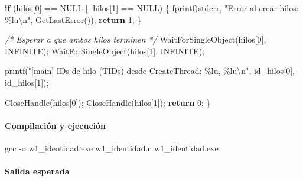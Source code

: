 \documentclass[
  spanish,
]{article}
\newenvironment{Shaded}{}{}
\newcommand{\AttributeTok}[1]{\textcolor[rgb]{0.49,0.56,0.16}{#1}}
\newcommand{\CommentTok}[1]{\textcolor[rgb]{0.38,0.63,0.69}{\textit{#1}}}
\newcommand{\ControlFlowTok}[1]{\textcolor[rgb]{0.00,0.44,0.13}{\textbf{#1}}}
\newcommand{\DecValTok}[1]{\textcolor[rgb]{0.25,0.63,0.44}{#1}}
\newcommand{\NormalTok}[1]{#1}
\newcommand{\OperatorTok}[1]{\textcolor[rgb]{0.40,0.40,0.40}{#1}}
\newcommand{\SpecialCharTok}[1]{\textcolor[rgb]{0.25,0.44,0.63}{#1}}
\newcommand{\StringTok}[1]{\textcolor[rgb]{0.25,0.44,0.63}{#1}}
\begin{document}
\begin{Shaded}
\begin{Highlighting}[]
    \ControlFlowTok{if} \OperatorTok{(}\NormalTok{hilos}\OperatorTok{[}\DecValTok{0}\OperatorTok{]} \OperatorTok{==}\NormalTok{ NULL }\OperatorTok{||}\NormalTok{ hilos}\OperatorTok{[}\DecValTok{1}\OperatorTok{]} \OperatorTok{==}\NormalTok{ NULL}\OperatorTok{)} \OperatorTok{\{}
\NormalTok{        fprintf}\OperatorTok{(}\NormalTok{stderr}\OperatorTok{,} \StringTok{"Error al crear hilos: }\SpecialCharTok{\%lu\textbackslash{}n}\StringTok{"}\OperatorTok{,}\NormalTok{ GetLastError}\OperatorTok{());}
        \ControlFlowTok{return} \DecValTok{1}\OperatorTok{;}
    \OperatorTok{\}}

    \CommentTok{/* Esperar a que ambos hilos terminen */}
\NormalTok{    WaitForSingleObject}\OperatorTok{(}\NormalTok{hilos}\OperatorTok{[}\DecValTok{0}\OperatorTok{],}\NormalTok{ INFINITE}\OperatorTok{);}
\NormalTok{    WaitForSingleObject}\OperatorTok{(}\NormalTok{hilos}\OperatorTok{[}\DecValTok{1}\OperatorTok{],}\NormalTok{ INFINITE}\OperatorTok{);}

\NormalTok{    printf}\OperatorTok{(}\StringTok{"[main]   IDs de hilo (TIDs) desde CreateThread: }\SpecialCharTok{\%lu}\StringTok{, }\SpecialCharTok{\%lu\textbackslash{}n}\StringTok{"}\OperatorTok{,}
\NormalTok{           id\_hilos}\OperatorTok{[}\DecValTok{0}\OperatorTok{],}\NormalTok{ id\_hilos}\OperatorTok{[}\DecValTok{1}\OperatorTok{]);}

\NormalTok{    CloseHandle}\OperatorTok{(}\NormalTok{hilos}\OperatorTok{[}\DecValTok{0}\OperatorTok{]);}
\NormalTok{    CloseHandle}\OperatorTok{(}\NormalTok{hilos}\OperatorTok{[}\DecValTok{1}\OperatorTok{]);}
    \ControlFlowTok{return} \DecValTok{0}\OperatorTok{;}
\OperatorTok{\}}
\end{Highlighting}
\end{Shaded}

\paragraph{Compilación y ejecución}\label{compilaciuxf3n-y-ejecuciuxf3n}

\begin{Shaded}
\begin{Highlighting}[]
\NormalTok{gcc }\AttributeTok{{-}o}\NormalTok{ w1\_identidad.exe w1\_identidad.c}
\NormalTok{w1\_identidad.exe}
\end{Highlighting}
\end{Shaded}

\paragraph{Salida esperada}\label{salida-esperada}
\end{document}

